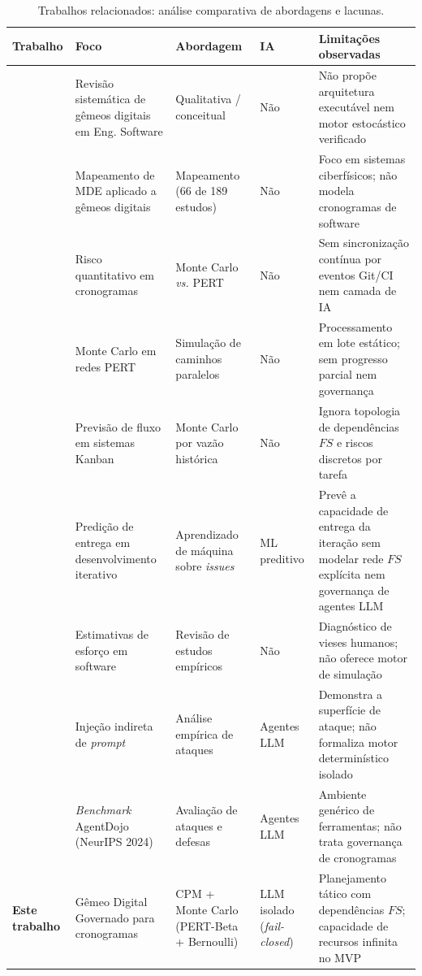 \documentclass[12pt,openany,oneside,a4paper,english,brazilian,sumario=tradicional]{abntex2}
\newcommand{\fonteautores}{\par\vspace{1mm}{\small Fonte: Elaborado pelos autores (2026).}}
\begin{document}
\begin{table}[htbp]
\caption{Trabalhos relacionados: análise comparativa de abordagens e lacunas.}\label{tab:relacionados}
{\scriptsize
\setlength{\tabcolsep}{3pt}
\begin{tabularx}{\textwidth}{L{2.2cm} L{2.4cm} L{2.4cm} L{1.7cm} Y}
\toprule
\textbf{Trabalho} & \textbf{Foco} & \textbf{Abordagem} & \textbf{IA} & \textbf{Limitações observadas}\\
\midrule
{} & Revisão sistemática de gêmeos digitais em Eng. Software & Qualitativa / conceitual & Não & Não propõe arquitetura executável nem motor estocástico verificado\\
 & Mapeamento de MDE aplicado a gêmeos digitais & Mapeamento (66 de 189 estudos) & Não & Foco em sistemas ciberfísicos; não modela cronogramas de software\\
 & Risco quantitativo em cronogramas & Monte Carlo \textit{vs.} PERT & Não & Sem sincronização contínua por eventos Git/CI nem camada de IA\\
 & Monte Carlo em redes PERT & Simulação de caminhos paralelos & Não & Processamento em lote estático; sem progresso parcial nem governança\\
 & Previsão de fluxo em sistemas Kanban & Monte Carlo por vazão histórica & Não & Ignora topologia de dependências $FS$ e riscos discretos por tarefa\\
 & Predição de entrega em desenvolvimento iterativo & Aprendizado de máquina sobre \textit{issues} & ML preditivo & Prevê a capacidade de entrega da iteração sem modelar rede $FS$ explícita nem governança de agentes LLM\\
 & Estimativas de esforço em software & Revisão de estudos empíricos & Não & Diagnóstico de vieses humanos; não oferece motor de simulação\\
 & Injeção indireta de \textit{prompt} & Análise empírica de ataques & Agentes LLM & Demonstra a superfície de ataque; não formaliza motor determinístico isolado\\
 & \textit{Benchmark} AgentDojo (NeurIPS 2024) & Avaliação de ataques e defesas & Agentes LLM & Ambiente genérico de ferramentas; não trata governança de cronogramas\\
\textbf{Este trabalho} & Gêmeo Digital Governado para cronogramas & CPM + Monte Carlo (PERT-Beta + Bernoulli) & LLM isolado (\textit{fail-closed}) & Planejamento tático com dependências $FS$; capacidade de recursos infinita no MVP\\
\bottomrule
\end{tabularx}}
\fonteautores
\end{table}
\end{document}
